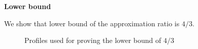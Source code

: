 \documentclass[twoside,11pt]{article}
\newcommand{\bd}{\mathbf}
\newcommand{\todo}[1]{}
\renewcommand{\todo}[1]{{\textbf{\color{red} TODO: {#1}}}}
\begin{document}

\noindent\textbf{Lower bound}

\noindent We show that lower bound of the approximation ratio is $4/3$.


\begin{figure}[h]
\caption{Profiles used for proving the lower bound of $4/3$}
\label{Fig.maxmin.lb}
\end{figure}
\end{document}
